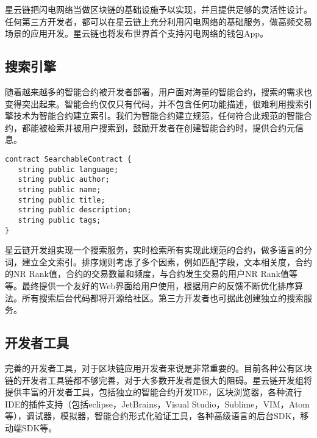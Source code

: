 星云链把闪电网络当做区块链的基础设施予以实现，并且提供足够的灵活性设计。任何第三方开发者，都可以在星云链上充分利用闪电网络的基础服务，做高频交易场景的应用开发。星云链也将发布世界首个支持闪电网络的钱包App。


\subsection{搜索引擎}
随着越来越多的智能合约被开发者部署，用户面对海量的智能合约，搜索的需求也变得突出起来。智能合约仅仅只有代码，并不包含任何功能描述，很难利用搜索引擎技术为智能合约建立索引。我们为智能合约建立规范，任何符合此规范的智能合约，都能被检索并被用户搜索到，鼓励开发者在创建智能合约时，提供合约元信息。

\begin{lstlisting}[frame=single]
contract SearchableContract {
   string public language;
   string public author;
   string public name;
   string public title;
   string public description;
   string public tags;
}
\end{lstlisting}

星云链开发组实现一个搜索服务，实时检索所有实现此规范的合约，做多语言的分词，建立全文索引。排序规则考虑了多个因素，例如匹配字段，文本相关度，合约的NR Rank值，合约的交易数量和频度，与合约发生交易的用户NR Rank值等等。最终提供一个友好的Web界面给用户使用，根据用户的反馈不断优化排序算法。所有搜索后台代码都将开源给社区。第三方开发者也可据此创建独立的搜索服务。

\subsection{开发者工具}
完善的开发者工具，对于区块链应用开发者来说是非常重要的。目前各种公有区块链的开发者工具链都不够完善，对于大多数开发者是很大的阻碍。星云链开发组将提供丰富的开发者工具，包括独立的智能合约开发IDE，区块浏览器，各种流行IDE的插件支持（包括eclipse，JetBrains，Visual Studio，Sublime，VIM，Atom等），调试器，模拟器，智能合约形式化验证工具，各种高级语言的后台SDK，移动端SDK等。
